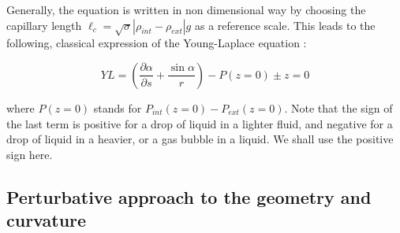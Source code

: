 \documentclass{jfm}
\newcommand\be{\begin{equation}}
\newcommand\ee{\end{equation}}
\newcommand\DP[2]{\frac{\partial #1}{\partial #2}}
\begin{document}
Generally, the equation is written in non dimensional way by choosing the capillary length 
$\ell_c = \sqrt{\sigma}{|\rho_{int} - \rho_{ext}| g}$ as a reference scale. This leads to the following, classical expression of the Young-Laplace equation :

\be
YL = \left( \DP{\alpha}{s} + \frac{\sin \alpha}{r} \right ) - P(z=0) \pm  z = 0
\label{eq:YLF}
\ee

where $P(z=0)$ stands for $P_{int}(z=0) - P_{ext}(z=0)$. Note that the sign of the last term is positive for a drop of liquid in a lighter fluid, and negative for a drop of liquid in a heavier, or a gas bubble in a liquid. We shall use the positive sign here.






\subsection{Perturbative approach to the geometry and curvature}
\end{document}
